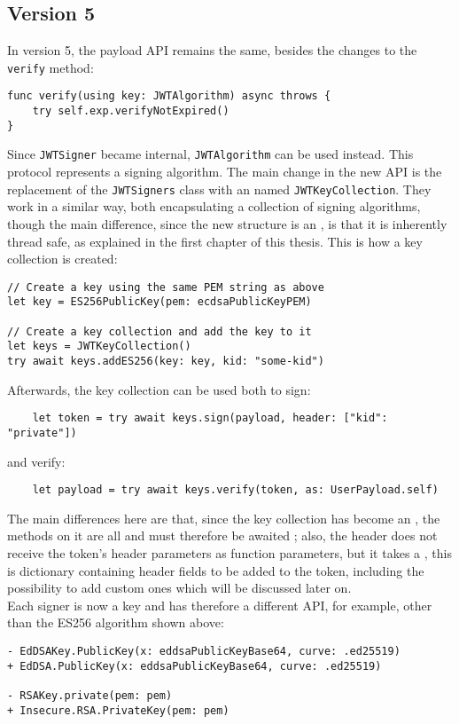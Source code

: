 \subsection{Version 5}
In version 5, the payload API remains the same, besides the changes to the \lstinline{verify} method:
\begin{verbatim}
func verify(using key: JWTAlgorithm) async throws {
    try self.exp.verifyNotExpired()
}
\end{verbatim}
Since \lstinline{JWTSigner} became internal, \lstinline{JWTAlgorithm} can be used instead. This protocol represents a signing algorithm. The main change in the new API is the replacement of the \lstinline{JWTSigners} class with an  named \lstinline{JWTKeyCollection}. They work in a similar way, both encapsulating a collection of signing algorithms, though the main difference, since the new structure is an , is that it is inherently thread safe, as explained in the first chapter of this thesis. This is how a key collection is created:
\begin{verbatim}
// Create a key using the same PEM string as above
let key = ES256PublicKey(pem: ecdsaPublicKeyPEM)

// Create a key collection and add the key to it
let keys = JWTKeyCollection()
try await keys.addES256(key: key, kid: "some-kid")
\end{verbatim}
Afterwards, the key collection can be used both to sign:
\begin{verbatim}
    let token = try await keys.sign(payload, header: ["kid": "private"])
\end{verbatim}
and verify:
\begin{verbatim}
    let payload = try await keys.verify(token, as: UserPayload.self)
\end{verbatim}
The main differences here are that, since the key collection has become an , the methods on it are all  and must therefore be awaited ; also, the header does not receive the token's header parameters as function parameters, but it takes a , this is dictionary containing header fields to be added to the token, including the possibility to add custom ones which will be discussed later on. \\
Each signer is now a key and has therefore a different API, for example, other than the ES256 algorithm shown above:
\begin{verbatim}
- EdDSAKey.PublicKey(x: eddsaPublicKeyBase64, curve: .ed25519)
+ EdDSA.PublicKey(x: eddsaPublicKeyBase64, curve: .ed25519)

- RSAKey.private(pem: pem)
+ Insecure.RSA.PrivateKey(pem: pem)
\end{verbatim}

